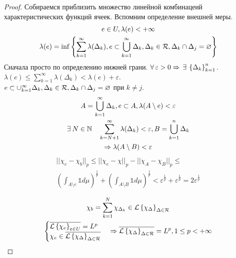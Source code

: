 \documentclass[document]{subfiles}
\begin{document}
\begin{proof}
    Собираемся приблизить множество линейной комбинацеий характеристических функций ячеек. Вспомним определение внешней меры.
    \begin{gather*}
        e \in U, \lambda(e) < + \infty \\
        \lambda(e) = \inf \left\{ \sum^\infty_{k=1} \lambda(\Delta_k), e \subset \bigcup^\infty_{k=1} \Delta_k, \Delta_k \in \mathcal{R}, \Delta_k \cap \Delta_j = \varnothing \right\}
    \end{gather*}
    Сначала просто по определению нижней грани. $\forall \varepsilon > 0 \Rightarrow \, \exists \seq{\Delta_k}^n_{k=1}$.
    $\lambda(e) \leq \sum^\infty_{k=1} \lambda(\Delta_k) < \lambda(e) + \varepsilon$. \\
    $e \subset \cup^\infty_{k=1} \Delta_k, \Delta_k \in \mathcal{R}, \Delta_k \cap \Delta_j = \varnothing$ при $k \ne j$. \\
    \begin{gather*}
        A = \bigcup^\infty_{k=1} \Delta_k, e \subset A, \lambda(A \setminus e) < \varepsilon \\
        \exists N \in \bN \quad \sum^\infty_{k=N+1} \lambda(\Delta_k) < \varepsilon, B = \bigcup^n_{k=1} \Delta_k \\
        \Rightarrow \lambda(A \setminus B) < \varepsilon 
    \end{gather*}
    \begin{multline*}
        || \chi_e - \chi_b ||_p \leq ||\chi_e - \chi||_p - ||\chi_A - \chi_B||_p \leq \\
        \left( \int_{A \setminus e} \mathbb{1} d\mu \right)^{\frac{1}{p}} + \left( \int_{A \setminus B} \mathbb{1} d\mu \right)^{\frac{1}{p}} < \varepsilon^{\frac{1}{p}} + \varepsilon^{\frac{1}{p}} = 2 \varepsilon^{\frac{1}{p}} 
    \end{multline*}

    \begin{gather*}
        \chi_b = \sum^N_{k=1} \chi_{\Delta_k} \in \mathcal{L} \left\{\chi_\Delta\right\}_{\Delta \in \mathcal{R}} \\
        \begin{cases}
            \overline{\mathcal{L} \left\{\chi_e\right\}_{e \in U}} = L^p \\
            \chi_e \in \overline{\mathcal{L} \left\{\chi_\Delta\right\}_{\Delta \in \mathcal{R}}}
        \end{cases} \Rightarrow \overline{\mathcal{L} \left\{\chi_\Delta\right\}_{\Delta \in \mathcal{R}}} = L^p, 1 \leq p < + \infty
    \end{gather*}

\end{proof}
\end{document}
